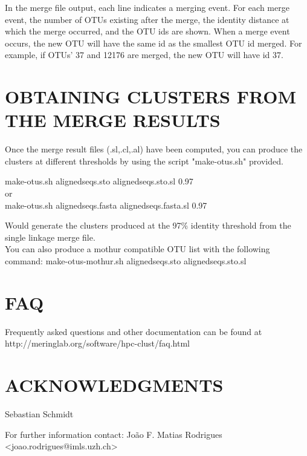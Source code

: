 \documentclass[10pt,a4paper]{article}
\begin{document}
In the merge file output, each line indicates a merging event. For each merge event, the
number of OTUs existing after the merge, the identity distance at which the merge occurred,
and the OTU ids are shown. When a merge event occurs, the new OTU will have the same id 
as the smallest OTU id merged. For example, if OTUs' 37 and 12176 are merged, the new OTU
will have id 37.


\section{OBTAINING CLUSTERS FROM THE MERGE RESULTS}

Once the merge result files (.sl,.cl,.al) have been computed, you can produce the clusters
at different thresholds by using the script "make-otus.sh" provided.

make-otus.sh alignedseqs.sto alignedseqs.sto.sl 0.97\\
or\\
make-otus.sh alignedseqs.fasta alignedseqs.fasta.sl 0.97

Would generate the clusters produced at the 97\% identity threshold from the single linkage
merge file.
\\
You can also produce a mothur compatible OTU list with the following command:
make-otus-mothur.sh alignedseqs.sto alignedseqs.sto.sl\\

\section{FAQ}
Frequently asked questions and other documentation can be found at
http://meringlab.org/software/hpc-clust/faq.html


\section*{ACKNOWLEDGMENTS}
Sebastian Schmidt




For further information contact: Jo\~ao F. Matias Rodrigues {\textless}joao.rodrigues@imls.uzh.ch\textgreater
\end{document}

